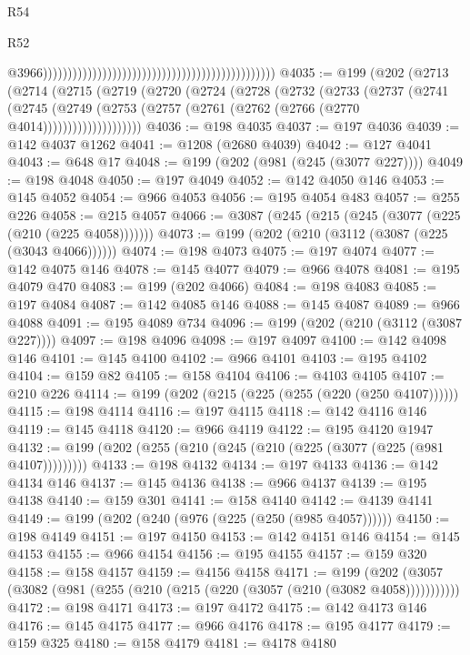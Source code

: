 \begin{lexlean}{R54}
\begin{lexlean}{R52}
\begin{coremodule}
{{{{{{{{{{{{{{{{{{{{{{{{{{{{{{{{{{{{{{{{{{{{{{{{{{{{{{{{{{{{{{{{{{{{{{{{{{{{{{{{{{{{{{{{{{{{{{{{{{{{{{{{{{{{{{{{{{{{{{{{{{{{{{{{{{{{{{{{{{{{{{{{{{{{{{{{{{{{{{{{{{{{{{{{{{{{{{{{{{{{{{{{{{{{{{{{{{{{{{                                                                                                  @3966)))))))))))))))))))))))))))))))))))))))))))))))
@4035 := @199
    (@202
      (@2713
        (@2714
          (@2715
            (@2719
              (@2720
                (@2724
                  (@2728
                    (@2732
                      (@2733
                        (@2737
                          (@2741
                            (@2745
                              (@2749
                                (@2753 (@2757 (@2761 (@2762 (@2766 (@2770 @4014))))))))))))))))))))
@4036 := @198 @4035
@4037 := @197 @4036
@4039 := @142 @4037 @1262
@4041 := @1208 (@2680 @4039)
@4042 := @127 @4041
@4043 := @648 @17
@4048 := @199 (@202 (@981 (@245 (@3077 @227))))
@4049 := @198 @4048
@4050 := @197 @4049
@4052 := @142 @4050 @146
@4053 := @145 @4052
@4054 := @966 @4053
@4056 := @195 @4054 @483
@4057 := @255 @226
@4058 := @215 @4057
@4066 := @3087 (@245 (@215 (@245 (@3077 (@225 (@210 (@225 @4058)))))))
@4073 := @199 (@202 (@210 (@3112 (@3087 (@225 (@3043 @4066))))))
@4074 := @198 @4073
@4075 := @197 @4074
@4077 := @142 @4075 @146
@4078 := @145 @4077
@4079 := @966 @4078
@4081 := @195 @4079 @470
@4083 := @199 (@202 @4066)
@4084 := @198 @4083
@4085 := @197 @4084
@4087 := @142 @4085 @146
@4088 := @145 @4087
@4089 := @966 @4088
@4091 := @195 @4089 @734
@4096 := @199 (@202 (@210 (@3112 (@3087 @227))))
@4097 := @198 @4096
@4098 := @197 @4097
@4100 := @142 @4098 @146
@4101 := @145 @4100
@4102 := @966 @4101
@4103 := @195 @4102
@4104 := @159 @82
@4105 := @158 @4104
@4106 := @4103 @4105
@4107 := @210 @226
@4114 := @199 (@202 (@215 (@225 (@255 (@220 (@250 @4107))))))
@4115 := @198 @4114
@4116 := @197 @4115
@4118 := @142 @4116 @146
@4119 := @145 @4118
@4120 := @966 @4119
@4122 := @195 @4120 @1947
@4132 := @199 (@202 (@255 (@210 (@245 (@210 (@225 (@3077 (@225 (@981 @4107)))))))))
@4133 := @198 @4132
@4134 := @197 @4133
@4136 := @142 @4134 @146
@4137 := @145 @4136
@4138 := @966 @4137
@4139 := @195 @4138
@4140 := @159 @301
@4141 := @158 @4140
@4142 := @4139 @4141
@4149 := @199 (@202 (@240 (@976 (@225 (@250 (@985 @4057))))))
@4150 := @198 @4149
@4151 := @197 @4150
@4153 := @142 @4151 @146
@4154 := @145 @4153
@4155 := @966 @4154
@4156 := @195 @4155
@4157 := @159 @320
@4158 := @158 @4157
@4159 := @4156 @4158
@4171 := @199 (@202 (@3057 (@3082 (@981 (@255 (@210 (@215 (@220 (@3057 (@210 (@3082 @4058)))))))))))
@4172 := @198 @4171
@4173 := @197 @4172
@4175 := @142 @4173 @146
@4176 := @145 @4175
@4177 := @966 @4176
@4178 := @195 @4177
@4179 := @159 @325
@4180 := @158 @4179
@4181 := @4178 @4180
}}}}}}}}}}}}}}}}}}}}}}}}}}}}}}}}}}}}}}}}}}}}}}}}}}}}}}}}}}}}}}}}}}}}}}}}}}}}}}}}}}}}}}}}}}}}}}}}}}}}}}}}}}}}}}}}}}}}}}}}}}}}}}}}}}}}}}}}}}}}}}}}}}}}}}}}}}}}}}}}}}}}}}}}}}}}}}}}}}}}}}}}}}}}}}}}}}}}}}
\end{coremodule}
\end{lexlean}
\end{lexlean}
